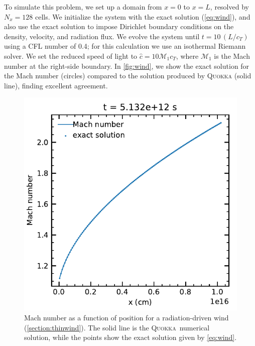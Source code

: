 \documentclass[fleqn,usenatbib]{mnras}
\newcommand{\quokka}{\textsc{Quokka}}
\begin{document}
To simulate this problem, we set up a domain from $x = 0$ to $x=L$, resolved by $N_x = 128$ cells. We initialize the system with the exact solution (\autoref{eq:wind}), and also use the exact solution to impose Dirichlet boundary conditions on the density, velocity, and radiation flux. We evolve the system until $t=10\,(L/c_T)$ using a CFL number of 0.4; for this calculation we use an isothermal Riemann solver. We set the reduced speed of light to $\hat c = 10 \mathcal{M}_1 c_T$, where $\mathcal{M}_1$ is the Mach number at the right-side boundary. In \autoref{fig:wind}, we show the exact solution for the Mach number (circles) compared to the solution produced by \textsc{Quokka} (solid line), finding excellent agreement.
\begin{figure}
    \includegraphics[width=\columnwidth]{radiation_force_tube_vel.pdf}
    \caption{Mach number as a function of position for a radiation-driven wind (\autoref{section:thinwind}). The solid line is the \quokka~numerical solution, while the points show the exact solution given by \autoref{eq:wind}.}
    \label{fig:wind}
\end{figure}
\end{document}
